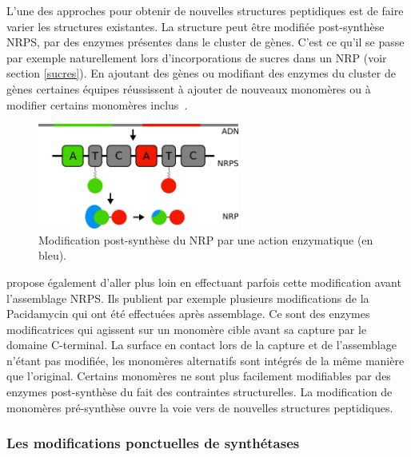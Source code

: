L'une des approches pour obtenir de nouvelles structures peptidiques est de faire varier les structures existantes.
La structure peut être modifiée post-synthèse NRPS, par des enzymes présentes dans le cluster de gènes.
C'est ce qu'il se passe par exemple naturellement lors d'incorporations de sucres dans un NRP (voir section \ref{sucres}).
En ajoutant des gènes ou modifiant des enzymes du cluster de gènes certaines équipes réussissent à ajouter de nouveaux monomères ou à modifier certains monomères inclus~\cite{giessen_ribosome-independent_2012}.

\begin{figure}[h!]
  \begin{center}
    \includegraphics[width=250px]{Figures/synthese/post_synth.png}
    \caption{\label{post_synth}Modification post-synthèse du NRP par une action enzymatique (en bleu).}
  \end{center}
\end{figure}

\cite{winn_recent_2016} propose également d'aller plus loin en effectuant parfois cette modification avant l'assemblage NRPS.
Ils publient par exemple plusieurs modifications de la Pacidamycin qui ont été effectuées après assemblage.
Ce sont des enzymes modificatrices qui agissent sur un monomère cible avant sa capture par le domaine C-terminal.
La surface en contact lors de la capture et de l'assemblage n'étant pas modifiée, les monomères alternatifs sont intégrés de la même manière que l'original.
Certains monomères ne sont plus facilement modifiables par des enzymes post-synthèse du fait des contraintes structurelles.
La modification de monomères pré-synthèse ouvre la voie vers de nouvelles structures peptidiques.


\subsubsection{Les modifications ponctuelles de synthétases}


